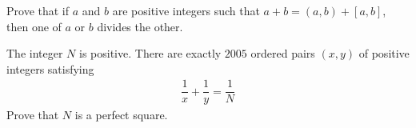 \documentclass{subfile}
\begin{document}
%

	\begin{problem}
		Prove that if $a$ and $b$ are positive integers such that $a+b=(a,b)+[a,b]$, then one of $a$ or $b$ divides the other.
	\end{problem}

%
%
%

	\begin{problem} %
		The integer $N$ is positive. There are exactly $2005$ ordered pairs $(x, y)$ of positive integers satisfying
			\begin{align*}
				\dfrac{1}{x} + \dfrac{1}{y} = \dfrac{1}{N}
			\end{align*}
		Prove that $N$ is a perfect square.
	\end{problem}
\end{document}
